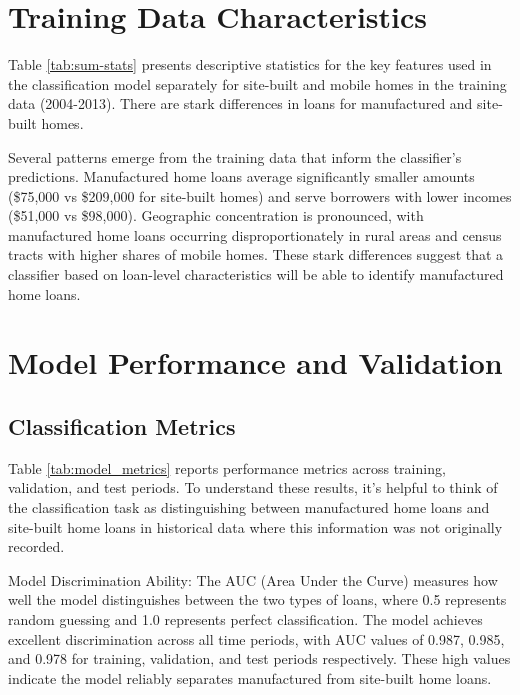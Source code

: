 \documentclass[11pt]{article}
\begin{document}
\section{Training Data Characteristics}

Table \ref{tab:sum-stats} presents descriptive statistics for the key features used in the classification model separately for site-built and mobile homes in the training data (2004-2013). There are stark differences in loans for manufactured and site-built homes.



Several patterns emerge from the training data that inform the classifier's predictions. Manufactured home loans average significantly smaller amounts (\$75,000 vs \$209,000 for site-built homes) and serve borrowers with lower incomes (\$51,000 vs \$98,000). Geographic concentration is pronounced, with manufactured home loans occurring disproportionately in rural areas and census tracts with higher shares of mobile homes. These stark differences suggest that a classifier based on loan-level characteristics will be able to identify manufactured home loans.

\section{Model Performance and Validation}

\subsection{Classification Metrics}

Table \ref{tab:model_metrics} reports performance metrics across training, validation, and test periods. To understand these results, it's helpful to think of the classification task as distinguishing between manufactured home loans and site-built home loans in historical data where this information was not originally recorded.



Model Discrimination Ability: The AUC (Area Under the Curve) measures how well the model distinguishes between the two types of loans, where 0.5 represents random guessing and 1.0 represents perfect classification. The model achieves excellent discrimination across all time periods, with AUC values of 0.987, 0.985, and 0.978 for training, validation, and test periods respectively. These high values indicate the model reliably separates manufactured from site-built home loans.
\end{document}

